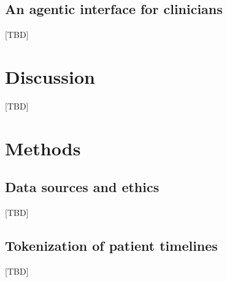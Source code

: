 \documentclass[pdflatex,sn-nature]{sn-jnl}
\begin{document}
\subsection{An agentic interface for clinicians}\label{sec:res-interface}
[TBD]

\section{Discussion}\label{sec:discussion}
[TBD]

\section{Methods}\label{sec:methods}

\subsection{Data sources and ethics}\label{sec:m-data}
[TBD]

\subsection{Tokenization of patient timelines}\label{sec:m-tokens}
[TBD]
\end{document}

